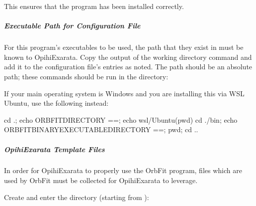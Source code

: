 \documentclass[letterpaper,11pt,english]{sphinxmanual}
\begin{document}
\sphinxAtStartPar
This ensures that the program has been installed correctly.


\subparagraph{Executable Path for Configuration File}
\label{\detokenize{technical/installation/orbfit:executable-path-for-configuration-file}}
\sphinxAtStartPar
For this program’s executables to be used, the path that they exist in must
be known to OpihiExarata. Copy the output of the working directory command
and add it to the configuration file’s entries as noted. The path should be
an absolute path; these commands should be run in the  directory:

\begin{sphinxVerbatim}[commandchars=\\\{\}]
    
      
\end{sphinxVerbatim}

\sphinxAtStartPar
If your main operating system is Windows and you are installing this via WSL
Ubuntu, use the following instead:

\begin{sphinxVerbatim}[commandchars=\\\{\}]
cd .; echo \PYGZdq{}ORBFIT\PYGZus{}DIRECTORY ==\PYGZdq{}; echo \PYGZdq{}\PYGZbs{}\PYGZbs{}\PYGZbs{}\PYGZbs{}wsl\PYGZdl{}/Ubuntu\PYGZdq{}\PYGZdl{}(pwd)
cd ./bin; echo \PYGZdq{}ORBFIT\PYGZus{}BINARY\PYGZus{}EXECUTABLE\PYGZus{}DIRECTORY ==\PYGZdq{}; pwd; cd ..
\end{sphinxVerbatim}


\subparagraph{OpihiExarata Template Files}
\label{\detokenize{technical/installation/orbfit:opihiexarata-template-files}}
\sphinxAtStartPar
In order for OpihiExarata to properly use the OrbFit program, files which are
used by OrbFit must be collected for OpihiExarata to leverage.

\sphinxAtStartPar
Create and enter the directory (starting from ):

\begin{sphinxVerbatim}[commandchars=\\\{\}]
   
\end{sphinxVerbatim}
\end{document}
